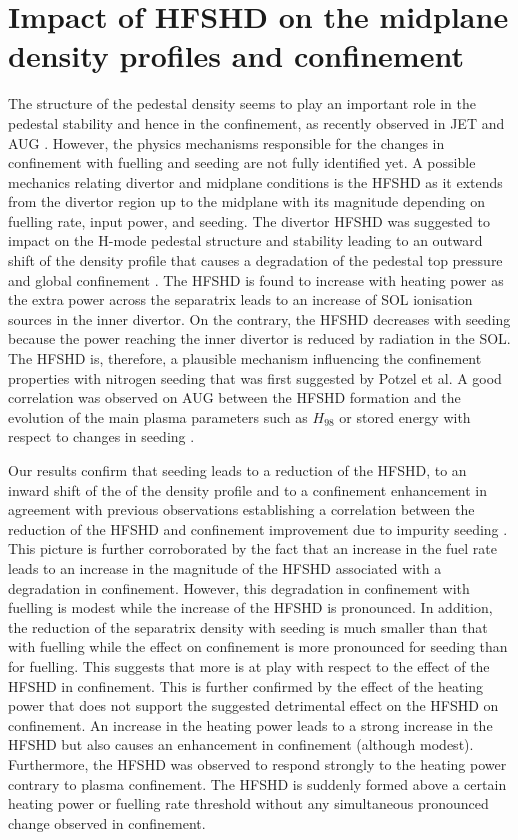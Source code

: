 \documentclass[12pt]{iopart}
\begin{document}
\section{Impact of HFSHD on the midplane density profiles and confinement}
\label{section:hfshdmidplanedenperfconf}

The structure of the pedestal density seems to play an important role in the pedestal stability and hence in the confinement, as recently observed in JET and AUG \cite{stefanikova2016effect,Dunne2017}. 
However, the physics mechanisms responsible for the changes in confinement with fuelling and seeding are not fully identified yet. A possible mechanics relating divertor and midplane conditions is the HFSHD as it extends from the divertor region up to the midplane with its magnitude depending on fuelling rate, input power, and seeding.
The divertor HFSHD was suggested to impact on the H-mode pedestal structure and stability leading to an outward shift of the density profile that causes a degradation of the pedestal top pressure and global confinement \cite{Dunne2017}.
The HFSHD is found to increase with heating power as the extra power across the separatrix leads to an increase of SOL ionisation sources in the inner divertor. On the contrary, the HFSHD decreases with seeding because the power reaching the inner divertor is reduced by radiation in the SOL. The HFSHD is, therefore, a plausible mechanism influencing the  confinement properties with nitrogen seeding that was first suggested by Potzel et al\cite{Potzel2015}. A good correlation was observed on AUG between the HFSHD formation and the evolution of the main plasma parameters such as $H_{98}$ or stored energy with respect to changes in seeding \cite{Potzel2015,Dunne2017}.  

Our results confirm that seeding leads to a reduction of the HFSHD, to an inward shift of the of the density profile and to a confinement enhancement in agreement with previous observations establishing a correlation between the reduction of the HFSHD and confinement improvement due to impurity seeding \cite{Potzel2015,Dunne2017}. This picture is further corroborated by the fact that an increase in the fuel rate leads to an increase in the magnitude of the HFSHD associated with a degradation in confinement. However, this degradation in confinement with fuelling is modest while the increase of the HFSHD is pronounced. In addition, the reduction of the separatrix density with seeding is much smaller than that with fuelling while the effect on confinement is more pronounced for seeding than for fuelling. This suggests that more is at play with respect to the effect of the HFSHD in confinement. This is further confirmed by the effect of the heating power that does not support the suggested detrimental effect on the HFSHD on confinement. An increase in the heating power leads to a strong increase in the HFSHD but also causes an enhancement in confinement (although modest). Furthermore, the HFSHD was observed to respond strongly to the heating power contrary to plasma confinement. The HFSHD is suddenly formed above a certain heating power or fuelling rate threshold without any simultaneous pronounced change observed in confinement. 
\end{document}
